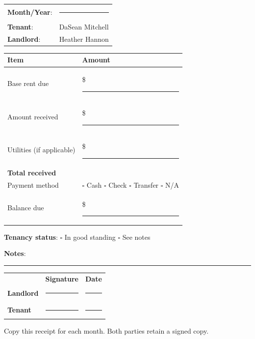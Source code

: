 \documentclass[11pt]{article}
\begin{document}
\bigskip

\begin{tabular}{@{}ll@{}}
\textbf{Month/Year}: & \rule{5cm}{0.4pt} \\[0.5em]
\textbf{Tenant}: & DaSean Mitchell \\[0.5em]
\textbf{Landlord}: & Heather Hannon \\
\end{tabular}

\bigskip

\begin{tabular}{@{}p{5cm}p{5cm}@{}}
\toprule
Item & Amount \\
\midrule
Base rent due & \$ \rule{3cm}{0.4pt} \\
Amount received & \$ \rule{3cm}{0.4pt} \\
Utilities (if applicable) & \$ \rule{3cm}{0.4pt} \\
\textbf{Total received} & \textbf{\$ \rule{3cm}{0.4pt}} \\
\midrule
Payment method & $\square$ Cash \quad $\square$ Check \quad $\square$ Transfer \quad $\square$ N/A \\
Balance due & \$ \rule{3cm}{0.4pt} \\
\bottomrule
\end{tabular}

\bigskip
\textbf{Tenancy status}: $\square$ In good standing \quad $\square$ See notes

\medskip
\textbf{Notes}: \rule{12cm}{0.4pt}

\bigskip\bigskip

\begin{tabular}{@{}p{2.5cm}p{5cm}p{3cm}@{}}
 & \textbf{Signature} & \textbf{Date} \\[1em]
\textbf{Landlord} & \rule{5cm}{0.4pt} & \rule{3cm}{0.4pt} \\[2em]
\textbf{Tenant} & \rule{5cm}{0.4pt} & \rule{3cm}{0.4pt} \\
\end{tabular}

\medskip
{\small Copy this receipt for each month. Both parties retain a signed copy.}
\end{document}
